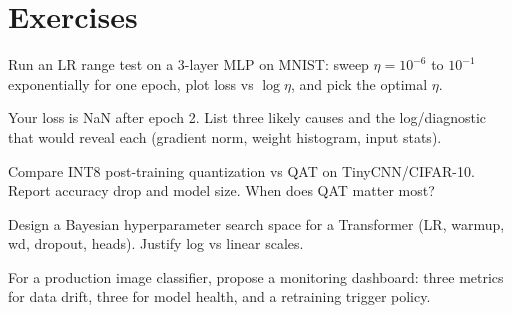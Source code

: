 \section{Exercises}
\begin{exercise} Run an LR range test on a 3-layer MLP on MNIST: sweep $\eta=10^{-6}$ to $10^{-1}$ exponentially for one epoch, plot loss vs $\log\eta$, and pick the optimal $\eta$.\end{exercise}
\begin{exercise} Your loss is NaN after epoch 2. List three likely causes and the log/diagnostic that would reveal each (gradient norm, weight histogram, input stats).\end{exercise}
\begin{exercise} Compare INT8 post-training quantization vs QAT on TinyCNN/CIFAR-10. Report accuracy drop and model size. When does QAT matter most?\end{exercise}
\begin{exercise} Design a Bayesian hyperparameter search space for a Transformer (LR, warmup, wd, dropout, heads). Justify log vs linear scales.\end{exercise}
\begin{exercise} For a production image classifier, propose a monitoring dashboard: three metrics for data drift, three for model health, and a retraining trigger policy.\end{exercise}
